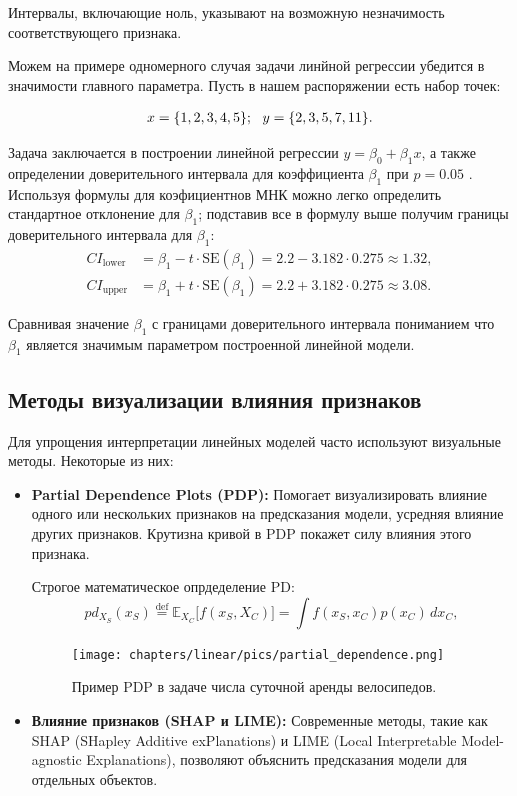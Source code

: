 Интервалы, включающие ноль, указывают на возможную незначимость соответствующего признака.

Можем на примере одномерного случая задачи линйной регрессии убедится в значимости главного параметра. Пусть в нашем распоряжении есть набор точек:

\begin{align}
x = \{1, 2, 3, 4, 5\}; \text{\space\space} y = \{2, 3, 5, 7, 11\}.
\end{align}

Задача заключается в построении линейной регрессии \(y = \beta_0 + \beta_1 x\), а также определении доверительного интервала для коэффициента \(\beta_1\) при \(p = 0.05\) . Используя формулы для коэфициентнов МНК можно легко определить стандартное отклонение для \(\beta_1\); подставив все в формулу выше получим границы доверительного интервала для \(\beta_1\):
\begin{align*}
CI_{\text{lower}} &= \beta_1 - t \cdot \text{SE}(\beta_1) = 2.2 - 3.182 \cdot 0.275 \approx 1.32, \\
CI_{\text{upper}} &= \beta_1 + t \cdot \text{SE}(\beta_1) = 2.2 + 3.182 \cdot 0.275 \approx 3.08.
\end{align*}

Сравнивая значение \(\beta_1\) с границами доверительного интервала пониманием что \(\beta_1\) является значимым параметром построенной линейной модели.

\subsection*{Методы визуализации влияния признаков}
Для упрощения интерпретации линейных моделей часто используют визуальные методы. Некоторые из них:
\begin{itemize}
    \item \textbf{Partial Dependence Plots (PDP):} Помогает визуализировать влияние одного или нескольких признаков на предсказания модели, усредняя влияние других признаков. Крутизна кривой в PDP покажет силу влияния этого признака.

    Строгое математическое опрдеделение PD:
    \begin{equation}
    pd_{X_S}(x_S) \overset{\text{def}}{=} \mathbb{E}_{X_C} \big[f(x_S, X_C)\big]
    = \int f(x_S, x_C) p(x_C) \, dx_C,
    \end{equation}

    \begin{figure}[h!]
    \centering
    \texttt{[image: chapters/linear/pics/partial\_dependence.png]}
    \caption{Пример PDP в задаче числа суточной аренды велосипедов.}
    \label{fig:pdp}
    \end{figure}

    \item \textbf{Влияние признаков (SHAP и LIME):} Современные методы, такие как SHAP (SHapley Additive exPlanations) и LIME (Local Interpretable Model-agnostic Explanations), позволяют объяснить предсказания модели для отдельных объектов.
\end{itemize}

